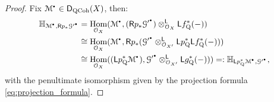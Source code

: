 \documentclass{amsart}
\theoremstyle{plain}
\theoremstyle{definition}
\theoremstyle{remark}
\numberwithin{equation}{section}
\newcommand{\Orb}{\mathcal{O}}
\DeclareMathOperator{\Hom}{Hom}
\newcommand{\RDERF}{\mathsf{R}}
\newcommand{\LDERF}{\mathsf{L}}
\newcommand{\DCAT}{\mathsf{D}}
\newcommand{\tensor}{\otimes}
\newcommand{\shv}[1]{\mathcal{{#1}}}
\newcommand{\E}[2]{\mathbb{H}_{{#1},{#2}}}
\newcommand{\QCPBK}[1]{{#1}_{\mathrm{Q}}^*}
\newcommand{\DQCOH}{\DCAT_{\mathrm{QCoh}}}
\newcommand{\sbt}{\,\begin{picture}(-1,-1)(0,-2)\circle*{1.5}\end{picture}\ }
\newcommand{\cplx}[1]{\shv{{#1}}^{\sbt}}
\begin{document}
\begin{proof}
  Fix $\cplx{M} \in \DQCOH(X)$, then:
  \begin{align*}
    \E{\cplx{M}}{\RDERF p_*\cplx{G'}} &=
    \Hom_{\Orb_X}(\cplx{M}, (\RDERF p_*\cplx{G'})
    \tensor_{\Orb_X}^\LDERF \LDERF \QCPBK{f}(-))\\
    &\cong \Hom_{\Orb_X}(\cplx{M}, \RDERF
    p_*(\cplx{G'} \tensor_{\Orb_{X'}}^\LDERF \LDERF \QCPBK{p}\LDERF
    \QCPBK{f}(-)))\\
    &\cong \Hom_{\Orb_X}((\LDERF \QCPBK{p}\cplx{M}),
    \cplx{G'} \tensor_{\Orb_{X'}}^\LDERF \LDERF 
    \QCPBK{g}(-))) =: \E{\LDERF \QCPBK{p}\cplx{M}}{\cplx{G'}},
  \end{align*}
  with the penultimate isomorphism given by the projection formula
  \eqref{eq:projection_formula}.  
\end{proof}
\end{document}
